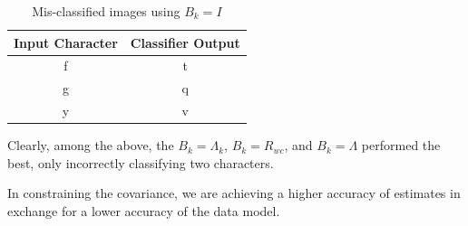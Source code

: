 \documentclass{article}
\begin{document}
\begin{table}[H]
    \centering
    \begin{tabular}{|c|c|}
        \hline
        Input Character & Classifier Output \\
        \hline
        f & t \\
        \hline
        g & q \\
        \hline
        y & v \\
        \hline
    \end{tabular}
    \caption{Mis-classified images using $B_k = I$}
\end{table}

Clearly, among the above, the $B_k = \Lambda_k$, $B_k = R_{wc}$, and $B_k = \Lambda$ performed the best, only incorrectly classifying two characters.

In constraining the covariance, we are achieving a higher accuracy of estimates in exchange for a lower accuracy of the data model.
\end{document}
